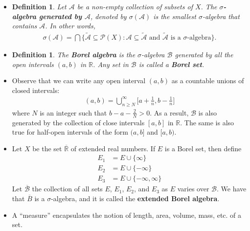 \documentclass[10pt]{article}
\newtheorem{definition}[lemma]{Definition}
\newcommand{\mcal}[1]{\mathcal{#1}}
\newcommand{\Real}{\mathbb{R}}
\begin{document}
\begin{itemize}
  \item \begin{definition}
  Let $\mcal{A}$ be a non-empty collection of subsets of $X$. The {\bf $\sigma$-algebra generated by $\mcal{A}$}, denoted by $\sigma(\mcal{A})$ is the smallest $\sigma$-algebra that contains $\mcal{A}$. In other words,
  \begin{align*}
    \sigma(\mcal{A}) = \bigcap\Big\{\tilde{\mcal{A}} \subseteq \mcal{P}(X) : \mcal{A} \subseteq \tilde{\mcal{A}} \mbox{ and $\tilde{\mcal{A}}$ is a $\sigma$-algebra}\Big\}.
  \end{align*}
  \end{definition}

  \item \begin{definition}\label{def:borel-algebra}
    The {\bf Borel algebra} is the $\sigma$-algebra $\mcal{B}$ generated by all the open intervals $(a,b)$ in $\Real$. Any set in $\mcal{B}$ is called a {\bf Borel set}.
  \end{definition}

  \item Observe that we can write any open interval $(a,b)$ as a countable unions of closed intervals:
  \begin{align*}    
    (a,b) = \bigcup_{n \geq N}^\infty \bigg[ a + \frac{1}{n}, b - \frac{1}{n} \bigg]
  \end{align*}
  where $N$ is an integer such that $b - a - \frac{2}{N} > 0$. As a result, $\mcal{B}$ is also generated by the collection of close intervals $[a,b]$ in $\Real$. The same is also true for half-open intervals of the form $(a,b]$ and $[a,b)$.
  
  \item Let $X$ be the set $\overline{\Real}$ of extended real numbers. If $E$ is a Borel set, then define
  \begin{align*}
    E_1 &= E \cup \{ \infty \} \\
    E_2 &= E \cup \{ -\infty \} \\
    E_3 &= E \cup \{ -\infty, \infty \}
  \end{align*}
  Let $\overline{\mcal{B}}$ the collection of all sets $E$, $E_1$, $E_2$, and $E_3$ as $E$ varies over $\mcal{B}$. We have that $\overline{B}$ is a $\sigma$-algebra, and it is called the {\bf extended Borel algebra}.  

  \item A ``measure'' encapsulates the notion of length, area, volume, mass, etc. of a set.
  

\end{itemize}
\end{document}
